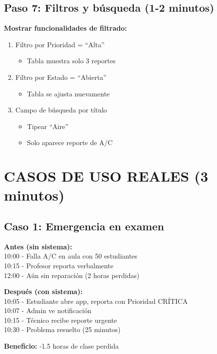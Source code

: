 \documentclass[12pt, a4paper, spanish]{article}
\begin{document}
\subsection{Paso 7: Filtros y búsqueda (1-2 minutos)}

\textbf{Mostrar funcionalidades de filtrado:}

\begin{enumerate}
    \item Filtro por Prioridad = ``Alta''
    \begin{itemize}
        \item Tabla muestra solo 3 reportes
    \end{itemize}
    
    \item Filtro por Estado = ``Abierta''
    \begin{itemize}
        \item Tabla se ajusta nuevamente
    \end{itemize}
    
    \item Campo de búsqueda por título
    \begin{itemize}
        \item Tipear ``Aire''
        \item Solo aparece reporte de A/C
    \end{itemize}
\end{enumerate}

\newpage

\section{CASOS DE USO REALES (3 minutos)}

\subsection{Caso 1: Emergencia en examen}

\begin{tcolorbox}[colback=rojo!10, colframe=rojo!50, title=Problema: A/C falla durante examen]
\textbf{Antes (sin sistema):} \\
10:00 - Falla A/C en aula con 50 estudiantes \\
10:15 - Profesor reporta verbalmente \\
12:00 - Aún sin reparación (2 horas perdidas)

\textbf{Después (con sistema):} \\
10:05 - Estudiante abre app, reporta con Prioridad CRÍTICA \\
10:07 - Admin ve notificación \\
10:15 - Técnico recibe reporte urgente \\
10:30 - Problema resuelto (25 minutos)

\textbf{Beneficio:} -1.5 horas de clase perdida
\end{tcolorbox}
\end{document}
